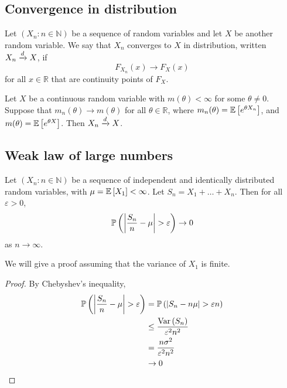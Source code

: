 \subsection{Convergence in distribution}
\begin{definition}
	Let \((X_n \colon n \in \mathbb N)\) be a sequence of random variables and let \(X\) be another random variable.
	We say that \(X_n\) converges to \(X\) in distribution, written \(X_n \xrightarrow{d} X\), if
	\[
		F_{X_n}(x) \to F_X(x)
	\]
	for all \(x \in \mathbb R\) that are continuity points of \(F_X\).
\end{definition}
\begin{theorem}
	Let \(X\) be a continuous random variable with \(m(\theta) < \infty\) for some \(\theta \neq 0\).
	Suppose that \(m_n(\theta) \to m(\theta)\) for all \(\theta \in \mathbb R\), where \(m_n(\theta) = \mathbb{E}\left[{e^{\theta X_n}}\right]\), and \(m(\theta) = \mathbb{E}\left[{e^{\theta X}}\right]\).
	Then \(X_n \xrightarrow{d} X\).
\end{theorem}

\subsection{Weak law of large numbers}
\begin{theorem}
	Let \((X_n \colon n \in \mathbb N)\) be a sequence of independent and identically distributed random variables, with \(\mu = \mathbb{E}\left[{X_1}\right] < \infty\).
	Let \(S_n = X_1 + \dots + X_n\).
	Then for all \(\varepsilon > 0\),
	\[
		\mathbb{P}\left({\abs{\frac{S_n}{n} - \mu} > \varepsilon}\right) \to 0
	\]
	as \(n \to \infty\).
\end{theorem}
We will give a proof assuming that the variance of \(X_1\) is finite.
\begin{proof}
	By Chebyshev's inequality,
	\begin{align*}
		\mathbb{P}\left({\abs{\frac{S_n}{n} - \mu} > \varepsilon}\right) & = \mathbb{P}\left({\abs{S_n - n\mu} > \varepsilon n}\right) \\
		                                               & \leq \frac{\operatorname{Var}\left({S_n}\right)}{\varepsilon^2 n^2}  \\
		                                               & = \frac{n\sigma^2}{\varepsilon^2 n^2}     \\
		                                               & \to 0
	\end{align*}
\end{proof}

